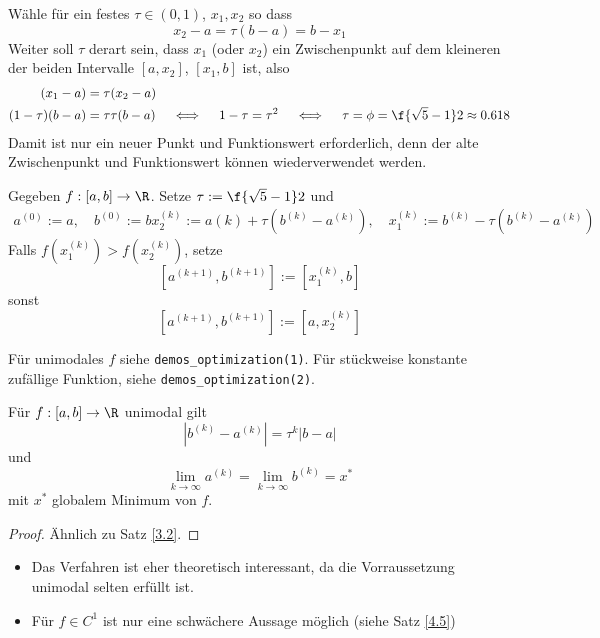 \documentclass[11pt]{scrbook}
\begin{document}
\begin{seg}
	Wähle für ein festes $\tau \in (0,1)$, $x_1, x_2$ so dass
	\[
		x_2-a = \tau (b-a) = b-x_1
	\]
	Weiter soll $\tau$ derart sein, dass $x_1$ (oder $x_2$) ein Zwischenpunkt auf dem kleineren der beiden Intervalle $[a,x_2]$, $[x_1,b]$ ist, also
	\begin{align*}
		(x_1 - a) &= \tau (x_2 - a) \\
		(1-\tau)(b-a) &= \tau \tau (b-a)
		\quad \iff \quad 1 - \tau = \tau^2 \quad\iff\quad \tau = \phi = \f{\sqrt 5 - 1}2 \approx 0.618
	\end{align*}
	Damit ist nur ein neuer Punkt und Funktionswert erforderlich, denn der alte Zwischenpunkt und Funktionswert können wiederverwendet werden.
\end{seg}

\begin{df} \label{4.3}
	Gegeben $f:[a,b] \to \R$.
	Setze $\tau := \f {\sqrt 5 - 1}2$ und
	\begin{gather*}
		a^{(0)} := a, \quad b^{(0)} := b
		x_2^{(k)} := a{(k)} + \tau(b^{(k)}-a^{(k)}), \quad x_1^{(k)} := b^{(k)} - \tau(b^{(k)}-a^{(k)})
	\end{gather*}
	Falls $f(x_1^{(k)}) > f(x_2^{(k)})$, setze
	\[
		[a^{(k+1)},b^{(k+1)}] := [x_1^{(k)}, b]
	\]
	sonst
	\[
		[a^{(k+1)},b^{(k+1)}] := [a, x_2^{(k)}]
	\]
\end{df}

\begin{ex*}
	Für unimodales $f$ siehe \verb|demos_optimization(1)|.
	Für stückweise konstante zufällige Funktion, siehe \verb|demos_optimization(2)|.
\end{ex*}

\begin{st} \label{4.4}
	Für $f: [a,b] \to \R$ unimodal gilt
	\[
		|b^{(k)} - a^{(k)}| = \tau^k |b-a|
	\]
	und
	\[
		\lim_{k\to \infty} a^{(k)} = \lim_{k\to \infty} b^{(k)} = x^*
	\]
	mit $x^*$ globalem Minimum von $f$.
	\begin{proof}
		Ähnlich zu Satz \ref{3.2}.
	\end{proof}
	\begin{note}
		\begin{itemize}
			\item
				Das Verfahren ist eher theoretisch interessant, da die Vorraussetzung unimodal selten erfüllt ist.
			\item
				Für $f\in C^1$ ist nur eine schwächere Aussage möglich (siehe Satz \ref{4.5})
		\end{itemize}
	\end{note}
\end{st}
\end{document}
